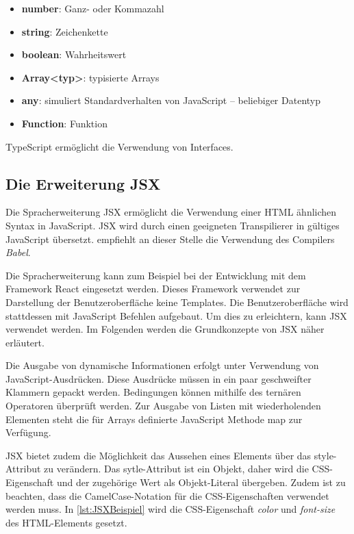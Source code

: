 \begin{itemize}
	\item  \textbf{number}: Ganz- oder Kommazahl
	\item \textbf{string}:  Zeichenkette
	\item \textbf{boolean}: Wahrheitswert
	\item \textbf{Array<typ>}: typisierte Arrays
	\item \textbf{any}: simuliert Standardverhalten von JavaScript  – beliebiger Datentyp
	\item \textbf{Function}: Funktion
\end{itemize}
TypeScript ermöglicht die Verwendung von Interfaces. \autocites[vgl.][40\psq]{Woiwode.2018}

\subsection{Die Erweiterung JSX}\label{sec:die-erweiterung-jsx}
\label{Babel}
Die Spracherweiterung JSX ermöglicht die Verwendung einer HTML ähnlichen Syntax in JavaScript. JSX wird durch einen geeigneten Transpilierer in gültiges JavaScript übersetzt.\textcite[vgl.][10]{Zeigermann.2016} empfiehlt an dieser Stelle die Verwendung des Compilers \textit{Babel}.

Die Spracherweiterung kann zum Beispiel bei der Entwicklung mit dem Framework React eingesetzt werden. Dieses Framework verwendet zur Darstellung der Benutzeroberfläche keine Templates. Die Benutzeroberfläche wird stattdessen mit JavaScript Befehlen aufgebaut. Um dies zu erleichtern, kann JSX verwendet werden. Im Folgenden werden die Grundkonzepte von JSX näher erläutert.

Die Ausgabe von dynamische Informationen erfolgt unter Verwendung von JavaScript-Ausdrücken. Diese Ausdrücke müssen in ein paar geschweifter Klammern gepackt werden. Bedingungen können mithilfe des ternären Operatoren überprüft werden. Zur Ausgabe von Listen mit wiederholenden Elementen steht die für Arrays definierte JavaScript Methode map zur Verfügung.

JSX bietet zudem die Möglichkeit das Aussehen eines Elements über das style-Attribut zu verändern. Das sytle-Attribut ist ein Objekt, daher wird die CSS-Eigenschaft und der zugehörige Wert als Objekt-Literal übergeben. Zudem ist zu beachten, dass die CamelCase-Notation für die CSS-Eigenschaften verwendet werden muss. In \autoref{lst:JSXBeispiel} wird die CSS-Eigenschaft \textit{color} und \textit{font-size} des HTML-Elements gesetzt.

